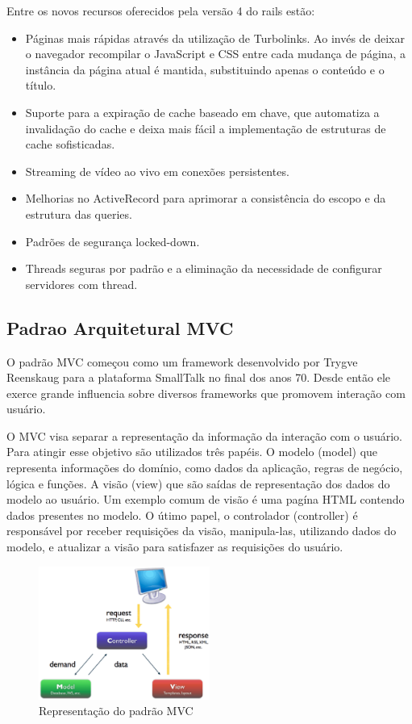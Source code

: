 Entre os novos recursos oferecidos pela versão 4 do rails estão:
\begin{itemize}
\item Páginas mais rápidas através da utilização de Turbolinks. Ao invés de deixar o navegador recompilar o JavaScript e CSS entre cada mudança de página, a instância da página atual é mantida, substituindo apenas o conteúdo e o título.
\item Suporte para a expiração de cache baseado em chave, que automatiza a invalidação do cache e deixa mais fácil a implementação de estruturas de cache sofisticadas.
\item Streaming de vídeo ao vivo em conexões persistentes.
\item Melhorias no ActiveRecord para aprimorar a consistência do escopo e da estrutura das queries.
\item Padrões de segurança locked-down.
\item Threads seguras por padrão e a eliminação da necessidade de configurar servidores com thread.
\end{itemize}



\subsection{Padrao Arquitetural MVC}

O padrão MVC começou como um framework desenvolvido por Trygve Reenskaug para a plataforma SmallTalk no final dos anos 70. Desde então ele exerce grande influencia sobre diversos frameworks que promovem interação com usuário.

O MVC visa separar a representação da informação da interação com o usuário. Para atingir esse objetivo são utilizados três papéis. O modelo (model) que representa informações do domínio, como dados da aplicação, regras de negócio, lógica e funções. A visão (view) que são saídas de representação dos dados do modelo ao usuário. Um exemplo comum de visão é uma pagína HTML contendo dados presentes no modelo. O útimo papel, o controlador (controller) é responsável por receber requisições da visão, manipula-las, utilizando dados do modelo, e atualizar a visão para satisfazer as requisições do usuário.

\graphicspath{{figuras/}}
\begin{figure}[H]
\centering
\includegraphics[width=0.5\textwidth]{mvc}
\caption{Representação do padrão MVC}
\label{mvc}
\end{figure}

